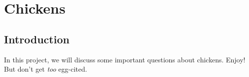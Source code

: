 \section{Chickens}

\subsection{Introduction}

In this project, we will discuss some important questions about chickens. Enjoy! But don't get \textit{too} egg-cited. 🐣